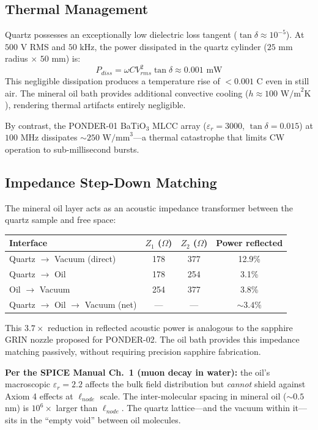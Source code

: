 \subsection{Thermal Management}
Quartz possesses an exceptionally low dielectric loss tangent ($\tan\delta \approx 10^{-5}$). At $500 \text{ V}$ RMS and $50 \text{ kHz}$, the power dissipated in the quartz cylinder ($25 \text{ mm}$ radius $\times$ $50 \text{ mm}$) is:
\begin{equation}
    P_{diss} = \omega C V_{rms}^2 \tan\delta \approx 0.001 \text{ mW}
\end{equation}
This negligible dissipation produces a temperature rise of $< 0.001$ \textdegree C even in still air. The mineral oil bath provides additional convective cooling ($h \approx 100 \text{ W/m}^2\text{K}$), rendering thermal artifacts entirely negligible.

By contrast, the PONDER-01 BaTiO$_3$ MLCC array ($\varepsilon_r = 3000$, $\tan\delta = 0.015$) at $100 \text{ MHz}$ dissipates $\sim 250 \text{ W/mm}^3$---a thermal catastrophe that limits CW operation to sub-millisecond bursts.

\subsection{Impedance Step-Down Matching}
The mineral oil layer acts as an acoustic impedance transformer between the quartz sample and free space:
\begin{center}
\begin{tabular}{|l|c|c|c|}
\hline
Interface & $Z_1$ ($\Omega$) & $Z_2$ ($\Omega$) & Power reflected \\ \hline
Quartz $\to$ Vacuum (direct) & 178 & 377 & 12.9\% \\
Quartz $\to$ Oil & 178 & 254 & 3.1\% \\
Oil $\to$ Vacuum & 254 & 377 & 3.8\% \\
Quartz $\to$ Oil $\to$ Vacuum (net) & --- & --- & $\sim 3.4\%$ \\ \hline
\end{tabular}
\end{center}
This $3.7\times$ reduction in reflected acoustic power is analogous to the sapphire GRIN nozzle proposed for PONDER-02. The oil bath provides this impedance matching passively, without requiring precision sapphire fabrication.

\textbf{Per the SPICE Manual Ch.~1 (muon decay in water):} the oil's macroscopic $\varepsilon_r = 2.2$ affects the bulk field distribution but \emph{cannot} shield against Axiom 4 effects at $\ell_{node}$ scale. The inter-molecular spacing in mineral oil ($\sim 0.5$ nm) is $10^6 \times$ larger than $\ell_{node}$. The quartz lattice---and the vacuum within it---sits in the ``empty void'' between oil molecules.

